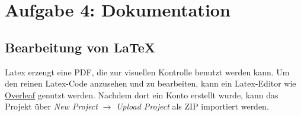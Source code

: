 \documentclass[twoside]{article}
\begin{document}
\section{Aufgabe 4: Dokumentation}
\subsection{Bearbeitung von LaTeX}
Latex erzeugt eine PDF, die zur visuellen Kontrolle benutzt werden kann. Um den reinen Latex-Code anzusehen und zu bearbeiten, kann ein Latex-Editor wie \href{https://www.overleaf.com}{Overleaf} genutzt werden. Nachdem dort ein Konto erstellt wurde, kann das Projekt über \textit{New Project} $\to$ \textit{Upload Project} als ZIP importiert werden.
\end{document}

